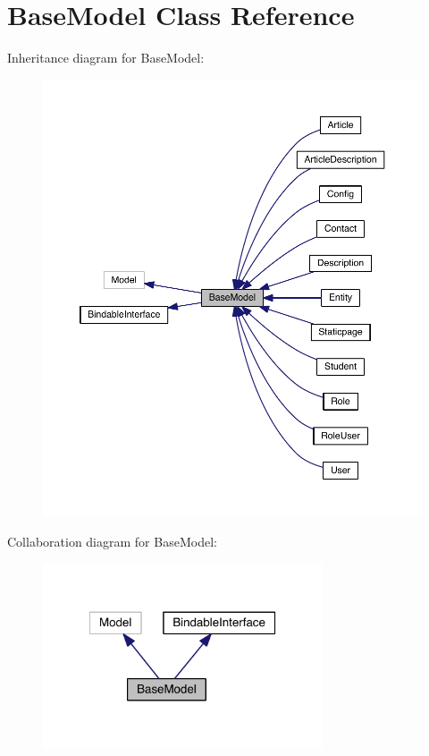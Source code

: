\hypertarget{classapp_1_1models_1_1core_1_1_base_model}{\section{Base\-Model Class Reference}
\label{classapp_1_1models_1_1core_1_1_base_model}
}


Inheritance diagram for Base\-Model\-:
\nopagebreak
\begin{figure}[H]
\begin{center}
\leavevmode
\includegraphics[width=350pt]{classapp_1_1models_1_1core_1_1_base_model__inherit__graph}
\end{center}
\end{figure}


Collaboration diagram for Base\-Model\-:
\nopagebreak
\begin{figure}[H]
\begin{center}
\leavevmode
\includegraphics[width=234pt]{classapp_1_1models_1_1core_1_1_base_model__coll__graph}
\end{center}
\end{figure}
